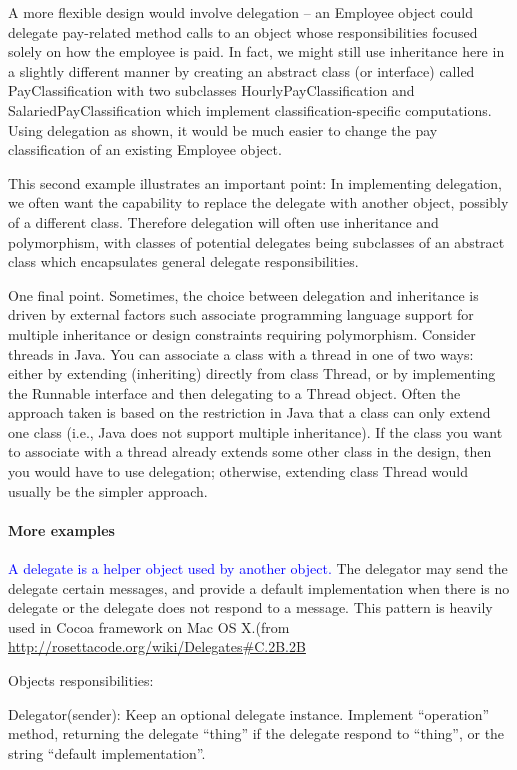 \documentclass{book}
\begin{document}
A more flexible design would involve delegation – an Employee object could delegate pay-related method calls to an object whose responsibilities focused solely on how the employee is paid. 
In fact, we might still use inheritance here in a slightly different manner by creating an abstract class (or interface) called
PayClassification with two subclasses HourlyPayClassification and SalariedPayClassification which implement classification-specific computations.
Using delegation as shown, it would be much easier to change the pay classification of an existing Employee object.

This second example illustrates an important point: In implementing delegation, we often want the capability to replace the delegate with another object,
possibly of a different class. Therefore delegation will often use inheritance and polymorphism,
with classes of potential delegates being subclasses of an abstract class which encapsulates general delegate responsibilities.

One final point. Sometimes, the choice between delegation and inheritance is driven by external factors such associate
programming language support for multiple inheritance or design constraints requiring polymorphism.
Consider threads in Java. You can associate a class with a thread in one of two ways: either by extending (inheriting) directly from class Thread,
or by implementing the Runnable interface and then delegating to a Thread object.
Often the approach taken is based on the restriction in Java that a class can only extend one class (i.e., Java does not support multiple inheritance).
If the class you want to associate with a thread already extends some other class in the design,
then you would have to use delegation; otherwise, extending class Thread would usually be the simpler approach. 
\paragraph{More examples}
\textcolor{blue}{A delegate is a helper object used by another object.}
The delegator may send the delegate certain messages, and provide a default implementation when there is no delegate or the delegate does not respond to a message.
This pattern is heavily used in Cocoa framework on Mac OS X.(from \url{http://rosettacode.org/wiki/Delegates#C.2B.2B}

Objects responsibilities:

Delegator(sender):
    Keep an optional delegate instance.
    Implement ``operation'' method, returning the delegate ``thing'' if the delegate respond to ``thing'', or the string ``default implementation''.
\end{document}

